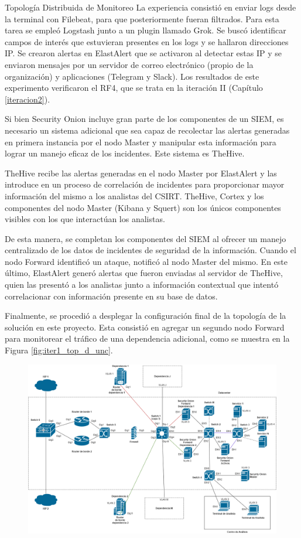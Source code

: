 \begin{subsection}{Topología Distribuida de Monitoreo}
            La experiencia consistió en enviar logs desde la terminal con Filebeat, para que posteriormente fueran filtrados. Para esta tarea se empleó Logstash junto a un plugin llamado Grok. Se buscó identificar campos de interés que estuvieran presentes en los logs y se hallaron direcciones IP. Se crearon alertas en ElastAlert que se activaron al detectar estas IP y se enviaron mensajes por un servidor de correo electrónico (propio de la organización) y aplicaciones (Telegram y Slack). Los resultados de este experimento verificaron el RF4, que se trata en la iteración II (Capítulo \ref{iteracion2}). \par
            Si bien Security Onion incluye gran parte de los componentes de un SIEM, es necesario un sistema adicional que sea capaz de recolectar las alertas generadas en primera instancia por el nodo Master y manipular esta información para lograr un manejo eficaz de los incidentes. Este sistema es TheHive. \par
            TheHive recibe las alertas generadas en el nodo Master por ElastAlert y las introduce en un proceso de correlación de incidentes para proporcionar mayor información del mismo a los analistas del CSIRT. TheHive, Cortex y los componentes del nodo Master (Kibana y Squert) son los únicos componentes visibles con los que interactúan los analistas. \par
            De esta manera, se completan los componentes del SIEM al ofrecer un manejo centralizado de los datos de incidentes de seguridad de la información. Cuando el nodo Forward identificó un  ataque, notificó al nodo Master del mismo. En este último, ElastAlert generó alertas que fueron enviadas al servidor de TheHive, quien las presentó a los analistas junto a información contextual que intentó correlacionar con información presente en su base de datos.\par
            Finalmente, se procedió a desplegar la configuración final de la topología de la solución en este proyecto. Esta consistió en agregar un segundo nodo Forward para monitorear el tráfico de una dependencia adicional, como se muestra en la Figura \ref{fig:iter1_top_d_unc}.
            \begin{figure}[H]
                \centering
                \includegraphics[width=1\textwidth]{./iteracion_1_imagenes/figura_topologia_d_unc.png}

\end{figure}
\end{subsection}
